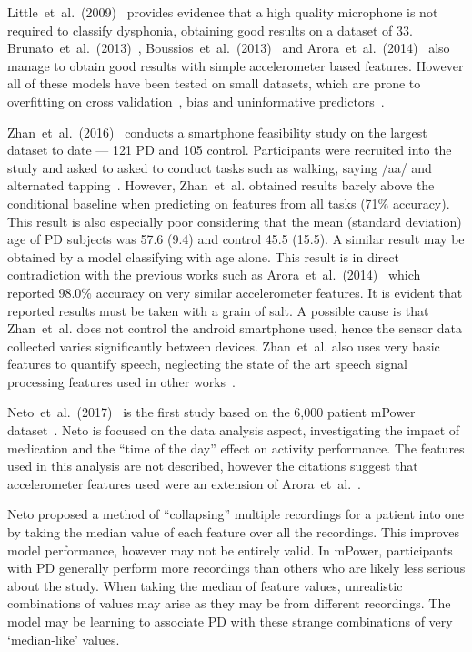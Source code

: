 \documentclass[12pt, twoside]{book}
\begin{document}
Little~et~al.~(2009)~\cite{splittledysphonia2009} provides evidence that a high quality microphone is not required to classify dysphonia, obtaining good results on a dataset of 33. Brunato~et~al.~(2013)~\cite{smartphonemjfoxlion}, Boussios~et~al.~(2013)~\cite{smartphonemjfoxB} and Arora~et~al.~(2014)~\cite{arora2014high} also manage to obtain good results with simple accelerometer based features. However all of these models have been tested on small datasets, which are prone to overfitting on cross validation~\cite{overfittingcv}, bias and uninformative predictors~\cite{freedmanparadox}. 


Zhan~et~al.~(2016)~\cite{zhan2016high} conducts a smartphone feasibility study on the largest dataset to date --- 121 PD and 105 control. Participants were recruited into the study and asked to asked to conduct tasks such as walking, saying /aa/ and alternated tapping~\cite{tapping}. However, Zhan~et~al. obtained results barely above the conditional baseline when predicting on features from all tasks (71\% accuracy). This result is also especially poor considering that the mean (standard deviation) age of PD subjects was 57.6 (9.4) and control 45.5 (15.5). A similar result may be obtained by a model classifying with age alone. This result is in direct contradiction with the previous works such as Arora~et~al.~(2014)~\cite{arora2014high} which reported 98.0\% accuracy on very similar accelerometer features. It is evident that reported results must be taken with a grain of salt. A possible cause is that Zhan~et~al. does not control the android smartphone used, hence the sensor data collected varies significantly between devices. Zhan~et~al. also uses very basic features to quantify speech, neglecting the state of the art speech signal processing features used in other works~\cite{ostextbook, spoverview}. 

Neto~et~al.~(2017)~\cite{mpowerneto2017analysis} is the first study based on the 6,000 patient mPower dataset~\cite{mpower}. Neto is focused on the data analysis aspect, investigating the impact of medication and the ``time of the day'' effect on activity performance. The features used in this analysis are not described, however the citations suggest that accelerometer features used were an extension of Arora~et~al.~\cite{arora2014high}. 

Neto proposed a method of ``collapsing'' multiple recordings for a patient into one by taking the median value of each feature over all the recordings. This improves model performance, however may not be entirely valid. In mPower, participants with PD generally perform more recordings than others who are likely less serious about the study. When taking the median of feature values, unrealistic combinations of values may arise as they may be from different recordings. The model may be learning to associate PD with these strange combinations of very `median-like' values.
\end{document}

